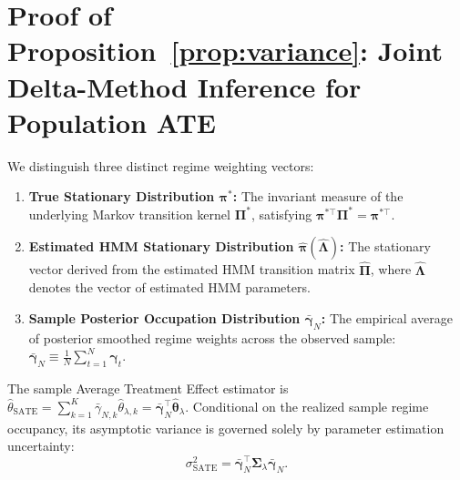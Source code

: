 \documentclass[twoside]{article}
\theoremstyle{definition}
\begin{document}
\vspace{-2mm}
\section{Proof of Proposition~\ref{prop:variance}: Joint Delta-Method Inference for Population ATE}
\label{app:proof_prop6}
We distinguish three distinct regime weighting vectors:
\begin{enumerate}
    \item \textbf{True Stationary Distribution $\boldsymbol{\pi}^*$:} The invariant measure of the underlying Markov transition kernel $\boldsymbol{\Pi}^*$, satisfying $\boldsymbol{\pi}^{*\top} \boldsymbol{\Pi}^* = \boldsymbol{\pi}^{*\top}$.
    \item \textbf{Estimated HMM Stationary Distribution $\hat{\boldsymbol{\pi}}(\hat{\boldsymbol{\Lambda}})$:} The stationary vector derived from the estimated HMM transition matrix $\hat{\boldsymbol{\Pi}}$, where $\hat{\boldsymbol{\Lambda}}$ denotes the vector of estimated HMM parameters.
    \item \textbf{Sample Posterior Occupation Distribution $\bar{\boldsymbol{\gamma}}_N$:} The empirical average of posterior smoothed regime weights across the observed sample: $\bar{\boldsymbol{\gamma}}_N \equiv \frac{1}{N}\sum_{t=1}^N \boldsymbol{\gamma}_t$.
\end{enumerate}

The sample Average Treatment Effect estimator is $\hat{\theta}_{\mathrm{SATE}} = \sum_{k=1}^K \bar{\gamma}_{N, k} \hat{\theta}_{\lambda, k} = \bar{\boldsymbol{\gamma}}_N^\top \hat{\boldsymbol{\theta}}_\lambda$. Conditional on the realized sample regime occupancy, its asymptotic variance is governed solely by parameter estimation uncertainty:
\begin{equation}
    \sigma_{\mathrm{SATE}}^2 = \bar{\boldsymbol{\gamma}}_N^\top \boldsymbol{\Sigma}_\lambda \bar{\boldsymbol{\gamma}}_N.
\end{equation}
\end{document}
